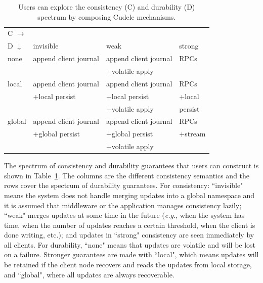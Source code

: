 \begin{table}[t]
\begin{center}
\begin{tabular}{ l | l | l | l }
  C \(\rightarrow\) &&& \\  
  D \(\downarrow\)  	     & invisible         & weak        & strong  \\\hline
  none                       & append client journal            & append client journal          & RPCs    \\
                             &                   & +volatile apply &         \\\hdashline
  local                      & append client journal            & append client journal          & RPCs    \\
                             & +local persist    & +local persist  & +local  \\
                             &                   & +volatile apply &  persist\\\hdashline
  global                     & append client journal            & append client journal          & RPCs    \\
                             & +global persist   & +global persist & +stream \\
                             &                   & +volatile apply &         \\
\end{tabular}

\caption{Users can explore the consistency (C) and
durability (D) spectrum by composing Cudele mechanisms. 
\label{table:spectrum}}
\end{center}
\end{table}

The spectrum of consistency and durability guarantees that users can construct
is shown in Table~\ref{table:spectrum}. The columns are the different
consistency semantics and the rows cover the spectrum of durability guarantees.
For consistency: ``invisible" means the system does not handle merging updates
into a global namespace and it is assumed that middleware or the application
manages consistency lazily; ``weak" merges updates at some time in the future
({\it e.g.}, when the system has time, when the number of updates reaches a
certain threshold, when the client is done writing, etc.); and updates in
``strong" consistency are seen immediately by all clients. For durability,
``none" means that updates are volatile and will be lost on a failure. Stronger
guarantees are made with ``local", which means updates will be retained if the
client node recovers and reads the updates from local storage, and ``global",
where all updates are always recoverable.

